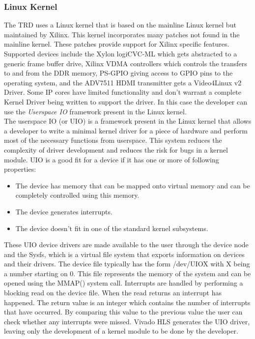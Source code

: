 \subsubsection{Linux Kernel}
The TRD uses a Linux kernel that is based on the mainline Linux kernel but maintained by Xilinx. This kernel incorporates many patches not found in the mainline kernel. These patches provide support for Xilinx specific features. Supported devices include the Xylon logiCVC-ML which gets abstracted to a generic frame buffer drive, Xilinx VDMA controllers which controls the transfers to and from the DDR memory, PS-GPIO giving access to GPIO pins to the operating system, and the ADV7511 HDMI transmitter gets a Video4Linux v2 Driver. Some IP cores have limited functionality and don't warrant a complete Kernel Driver being written to support the driver. In this case the developer can use the \emph{Userspace IO} framework present in the Linux kernel.\\
The userspace IO (or UIO) is a framework present in the Linux kernel that allows a developer to write a minimal kernel driver for a piece of hardware and perform most of the necessary functions from userspace. This system reduces the complexity of driver development and reduces the risk for bugs in a kernel module. UIO is a good fit for a device if it has one or more of following properties:
\begin{itemize}
	\item The device has memory that can be mapped onto virtual memory and can be completely controlled using this memory.
	\item The device generates interrupts.
	\item The device doesn't fit in one of the standard kernel subsystems.
\end{itemize}

These UIO device drivers are made available to the user through the device node and the Sysfs, which is a virtual file system that exports information on devices and their drivers. The device file typically has the form /dev/UIOX with X being a number starting on 0. This file represents the memory of the system and can be opened using the MMAP() system call. Interrupts are handled by performing a blocking read on the device file. When the read returns an interrupt has happened. The return value is an integer which contains the number of interrupts that have occurred. By comparing this value to the previous value the user can check whether any interrupts were missed. Vivado HLS generates the UIO driver, leaving only the development of a kernel module to be done by the developer.

